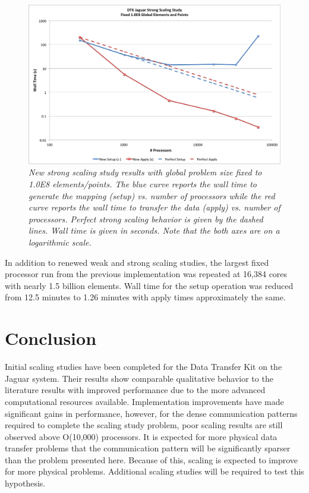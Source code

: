\documentclass[note]{TechNote}
\begin{document}
\begin{figure}[htpb!]
  \centering
  \includegraphics[width=5.5in]{NewStrongScaling.png}
  \caption{\sl New strong scaling study results with global problem
    size fixed to 1.0E8 elements/points. The blue curve reports the
    wall time to generate the mapping (setup) vs. number of processors
    while the red curve reports the wall time to transfer the data
    (apply) vs. number of processors. Perfect strong scaling behavior
    is given by the dashed lines. Wall time is given in seconds. Note
    that the both axes are on a logarithmic scale. }
  \label{fig:new_strong_scaling}
\end{figure}

In addition to renewed weak and strong scaling studies, the largest
fixed processor run from the previous implementation was repeated at
16,384 cores with nearly 1.5 billion elements. Wall time for the setup
operation was reduced from 12.5 minutes to 1.26 minutes with apply
times approximately the same.

\section{Conclusion}
Initial scaling studies have been completed for the Data Transfer Kit
on the Jaguar system. Their results show comparable qualitative
behavior to the literature results with improved performance due to
the more advanced computational resources available. Implementation
improvements have made significant gains in performance, however, for
the dense communication patterns required to complete the scaling
study problem, poor scaling results are still observed above O(10,000)
processors. It is expected for more physical data transfer problems
that the communication pattern will be significantly sparser than the
problem presented here. Because of this, scaling is expected to
improve for more physical problems. Additional scaling studies will be
required to test this hypothesis.





\closing
\caution
\end{document}
